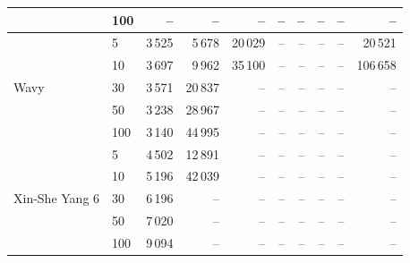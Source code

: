 {\begin{longtable}{llrrrrrrrr}
 & 100 & -- & -- & -- & -- & -- & -- & -- & -- \\
\midrule
\multirow{5}{*}{Wavy} & 5 & 3\,525 & 5\,678 & 20\,029 & -- & -- & -- & -- & 20\,521 \\*
 & 10 & 3\,697 & 9\,962 & 35\,100 & -- & -- & -- & -- & 106\,658 \\*
 & 30 & 3\,571 & 20\,837 & -- & -- & -- & -- & -- & -- \\*
 & 50 & 3\,238 & 28\,967 & -- & -- & -- & -- & -- & -- \\*
 & 100 & 3\,140 & 44\,995 & -- & -- & -- & -- & -- & -- \\
\midrule
\multirow{5}{*}{Xin-She Yang 6} & 5 & 4\,502 & 12\,891 & -- & -- & -- & -- & -- & -- \\*
 & 10 & 5\,196 & 42\,039 & -- & -- & -- & -- & -- & -- \\*
 & 30 & 6\,196 & -- & -- & -- & -- & -- & -- & -- \\*
 & 50 & 7\,020 & -- & -- & -- & -- & -- & -- & -- \\*
 & 100 & 9\,094 & -- & -- & -- & -- & -- & -- & -- \\
\end{longtable}
}

